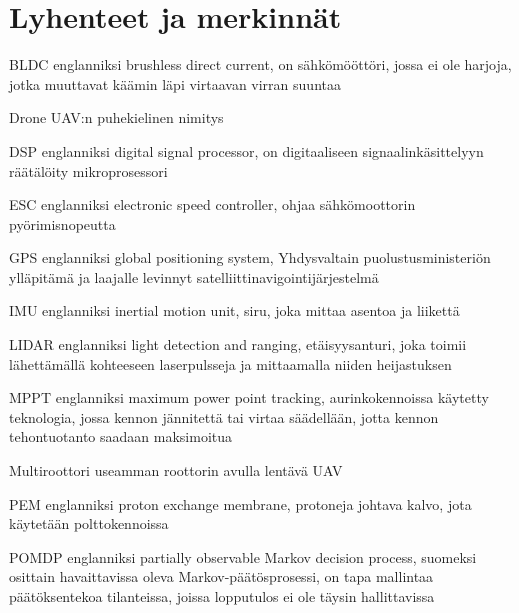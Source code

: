 \chapter*{Lyhenteet ja merkinnät}

\begin{termlist}
\setlength\itemsep{1em}

\item [BLDC] englanniksi brushless direct current, on sähkömööttöri, jossa ei
  ole harjoja, jotka muuttavat käämin läpi virtaavan virran suuntaa

\item [Drone] UAV:n puhekielinen nimitys

\item [DSP] englanniksi digital signal processor, on digitaaliseen
  signaalinkäsittelyyn räätälöity mikroprosessori

\item [ESC] englanniksi electronic speed controller, ohjaa sähkömoottorin
  pyörimisnopeutta

\item [GPS] englanniksi global positioning system, Yhdysvaltain
  puolustusministeriön ylläpitämä ja laajalle levinnyt
  satelliittinavigointijärjestelmä

\item [IMU] englanniksi inertial motion unit, siru, joka mittaa asentoa ja
  liikettä

\item [LIDAR] englanniksi light detection and ranging, etäisyysanturi, joka
  toimii lähettämällä kohteeseen laserpulsseja ja mittaamalla niiden
  heijastuksen

\item [MPPT] englanniksi maximum power point tracking, aurinkokennoissa
  käytetty teknologia, jossa kennon jännitettä tai virtaa säädellään, jotta
  kennon tehontuotanto saadaan maksimoitua

\item [Multiroottori] useamman roottorin avulla lentävä UAV

\item [PEM] englanniksi proton exchange membrane, protoneja johtava kalvo, jota
  käytetään polttokennoissa

\item [POMDP] englanniksi partially observable Markov decision process,
  suomeksi osittain havaittavissa oleva Markov-päätösprosessi, on tapa
  mallintaa päätöksentekoa tilanteissa, joissa lopputulos ei ole täysin
  hallittavissa


\end{termlist}
